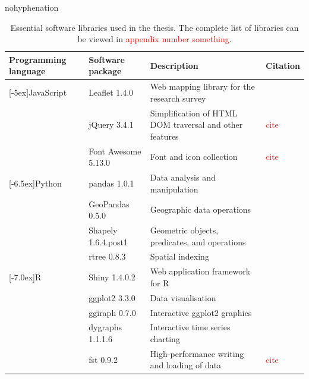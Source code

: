 \begin{hyphenrules}{nohyphenation}
    \begin{table}[H]
        \centering
        \caption[Essential software packages in thesis]{Essential software libraries used in the thesis. The complete list of libraries can be viewed in \textcolor{red}{appendix number something}.} 
        \label{tab:used_soft}
        \def\arraystretch{1.2}
        \setlength\tabcolsep{1.2ex}
        \begin{tabular}{ @{} >{\raggedright\arraybackslash}p{2.5cm} >{\raggedright\arraybackslash}p{3cm} >{\raggedright\arraybackslash}p{4cm} >{\raggedleft\arraybackslash}p{3cm} @{} }
            \toprule
            Programming language & Software package & Description & Citation \\
            \midrule
            \multirow{3}{*}[-5ex]{JavaScript} & Leaflet 1.4.0 & Web mapping library for the research survey & \cite{Agafonkin2019} \\
            & jQuery 3.4.1 & Simplification of HTML DOM traversal and other features & \textcolor{red}{cite} \\
            & Font Awesome 5.13.0 & Font and icon collection & \textcolor{red}{cite} \\
            \greyrule
            \multirow{4}{*}[-6.5ex]{Python} & pandas 1.0.1 & Data analysis and manipulation & \cite{McKinney2011a} \\
            & GeoPandas 0.5.0 & Geographic data operations & \cite{GeoPandasDevelopers2019} \\
            & Shapely 1.6.4.post1 & Geometric objects, predicates, and operations & \cite{Gillies2019} \\
            & rtree 0.8.3 & Spatial indexing & \cite{Gillies2014} \\
            \greyrule
            \multirow{4}{*}[-7.0ex]{R} & Shiny 1.4.0.2 & Web application framework for R & \cite{Chang2019} \\
            & ggplot2 3.3.0 & Data visualisation & \cite{Wickham2016} \\
            & ggiraph 0.7.0 & Interactive ggplot2 graphics & \cite{Gohel2019} \\
            & dygraphs 1.1.1.6 & Interactive time series charting & \cite{Vanderkam2018} \\
            & fst 0.9.2 & High-performance writing and loading of data & \textcolor{red}{cite} \\
            \bottomrule
        \end{tabular}
    \end{table} 
\end{hyphenrules}

